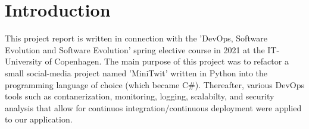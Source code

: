 \section{Introduction}
This project report is written in connection with the 'DevOps, Software Evolution and Software Evolution' spring elective course in 2021 at the IT-University of Copenhagen. The main purpose of this project was to refactor a small social-media project named 'MiniTwit' written in Python into the programming language of choice (which became C\#). Thereafter, various DevOps tools such as contanerization, monitoring, logging, scalabilty, and security analysis  that allow for continuos integration/continuous deployment were applied to our application.